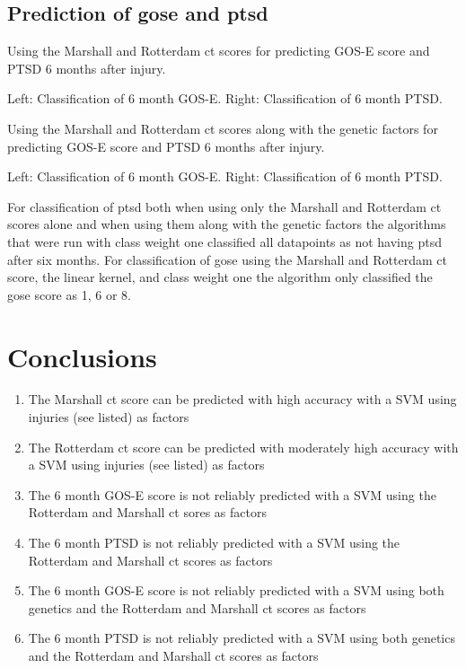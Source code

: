 \documentclass[11pt]{article}
\begin{document}
\subsection{Prediction of \gls{gose} and \gls{ptsd}}
Using the Marshall and Rotterdam \gls{ct} scores for predicting GOS-E score and PTSD 6 months after injury.\\
\begin{center}
  Left: Classification of 6 month GOS-E. Right: Classification of 6 month PTSD.\\
   \hspace{.5cm}
\end{center}
\vspace{1cm}
Using the Marshall and Rotterdam \gls{ct} scores along with the genetic factors for predicting GOS-E score and PTSD 6 months after injury.\\
\begin{center}
  Left: Classification of 6 month GOS-E. Right: Classification of 6 month PTSD.\\
   \hspace{.5cm}
\end{center}
For classification of \gls{ptsd} both when using only the Marshall and Rotterdam \gls{ct} scores alone and when using them along with the genetic factors the algorithms that were run with class weight one classified all datapoints as not having \gls{ptsd} after six months. For classification of \gls{gose} using the Marshall and Rotterdam \gls{ct} score, the linear kernel, and class weight one the algorithm only classified the \gls{gose} score as 1, 6 or 8.

\section{Conclusions}

\begin{enumerate}
  \item{The Marshall \gls{ct} score can be predicted with high accuracy with a SVM using injuries (see listed) as factors}
  \item{The Rotterdam \gls{ct} score can be predicted with moderately high accuracy with a SVM using injuries (see listed) as factors}
  \item{The 6 month GOS-E score is not reliably predicted with a SVM using the Rotterdam and Marshall \gls{ct} sores as factors}
  \item{The 6 month PTSD is not reliably predicted with a SVM using the Rotterdam and Marshall \gls{ct} scores as factors}
  \item{The 6 month GOS-E score is not reliably predicted with a SVM using both genetics and the Rotterdam and Marshall \gls{ct} scores as factors}
  \item{The 6 month PTSD is not reliably predicted with a SVM using both genetics and the Rotterdam and Marshall \gls{ct} scores as factors}
\end{enumerate}
\end{document}
